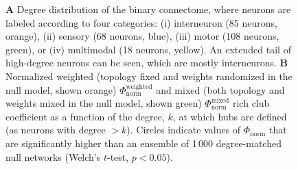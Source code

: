 \documentclass[10pt,letterpaper]{article}
\begin{document}
{\begin{figure}[h]
    \caption{\textbf{A} Degree distribution of the binary connectome, where neurons are labeled according to four categories:
(i) interneuron (85 neurons, orange),
(ii) sensory (68 neurons, blue),
(iii) motor (108 neurons, green), or
(iv) multimodal (18 neurons, yellow).
An extended tail of high-degree neurons can be seen, which are mostly interneurons.
\textbf{B}
Normalized weighted (topology fixed and weights randomized in the null model, shown orange) $\Phi_\mathrm{norm}^\mathrm{weighted}$ and mixed (both topology and weights mixed in the null model, shown green) $\Phi_\mathrm{norm}^\mathrm{mixed}$ rich club coefficient as a function of the degree, $k$, at which hubs are defined (as neurons with degree $>k$).
Circles indicate values of $\Phi_\mathrm{norm}$ that are significantly higher than an ensemble of 1\,000 degree-matched null networks (Welch's $t$-test, $p < 0.05$).
\label{fig:S_weightedRC}
}
\end{figure}




}
\end{document}
